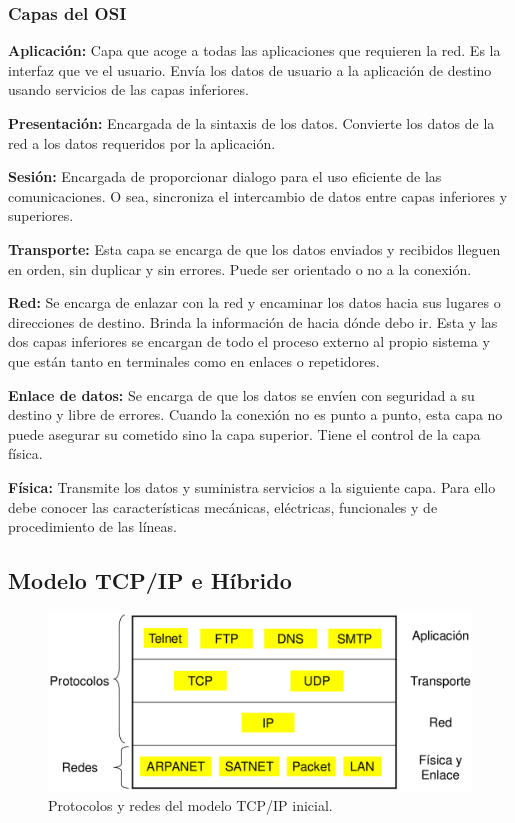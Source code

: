 \documentclass[10pt,a4paper]{article}
\begin{document}
\subsubsection{Capas del OSI}
\begin{description}
\item \textbf{Aplicación:} Capa que acoge a todas las aplicaciones que requieren la red. Es la interfaz que ve el usuario. Envía los datos de usuario a la aplicación de destino usando servicios de las capas inferiores.
\item \textbf{Presentación:} Encargada de la sintaxis de los datos. Convierte los datos de la red a los datos requeridos por la aplicación.
\item \textbf{Sesión:} Encargada de proporcionar dialogo para el uso eficiente de las comunicaciones. O sea, sincroniza el intercambio de datos entre capas inferiores y superiores.
\item \textbf{Transporte:} Esta capa se encarga de que los datos enviados y recibidos lleguen en orden, sin duplicar y sin errores. Puede ser orientado o no a la conexión.
\item \textbf{Red:} Se encarga de enlazar con la red y encaminar los datos hacia sus lugares o direcciones de destino. Brinda la información de hacia dónde debo ir. Esta y las dos capas inferiores se encargan de todo el proceso externo al propio sistema y que están tanto en terminales como en enlaces o repetidores.
\item \textbf{Enlace de datos:} Se encarga de que los datos se envíen con seguridad a su destino y libre de errores. Cuando la conexión no es punto a punto, esta capa no puede asegurar su cometido sino la capa superior. Tiene el control de la capa física.
\item \textbf{Física:} Transmite los datos y suministra servicios a la siguiente capa. Para ello debe conocer las características mecánicas, eléctricas, funcionales y de procedimiento de las líneas.
\end{description}

\subsection{Modelo TCP/IP e Híbrido}

\begin{figure}
  \caption{Protocolos y redes del modelo TCP/IP inicial.}
  \label{fig:tcp_ip}  
  \centering
  \hbox{\includegraphics[width=0.45\textwidth-\fboxrule-\fboxrule]{imgs/tcp_ip.png}}  
\end{figure}
\end{document}
